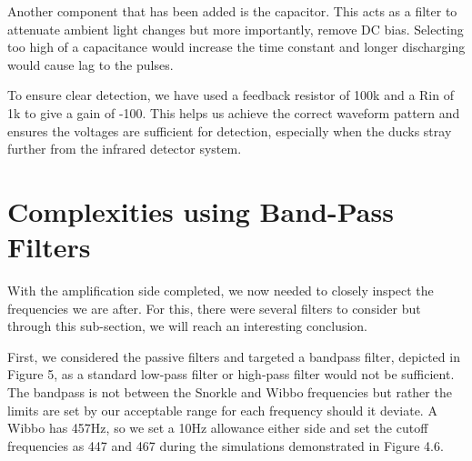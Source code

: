 Another component that has been added is the capacitor. This acts as a filter to attenuate ambient light changes but more importantly, remove DC bias. Selecting too high of a capacitance would increase the time constant and longer discharging would cause lag to the pulses.

To ensure clear detection, we have used a feedback resistor of 100k and a Rin of 1k to give a gain of -100. This helps us achieve the correct waveform pattern and ensures the voltages are sufficient for detection, especially when the ducks stray further from the infrared detector system.

\section{Complexities using Band-Pass Filters}
With the amplification side completed, we now needed to closely inspect the frequencies we are after. For this, there were several filters to consider but through this sub-section, we will reach an interesting conclusion.

First, we considered the passive filters and targeted a bandpass filter, depicted in Figure 5, as a standard low-pass filter or high-pass filter would not be sufficient. The bandpass is not between the Snorkle and Wibbo frequencies but rather the limits are set by our acceptable range for each frequency should it deviate. A Wibbo has 457Hz, so we set a 10Hz allowance either side and set the cutoff frequencies as 447 and 467 during the simulations demonstrated in Figure 4.6.

